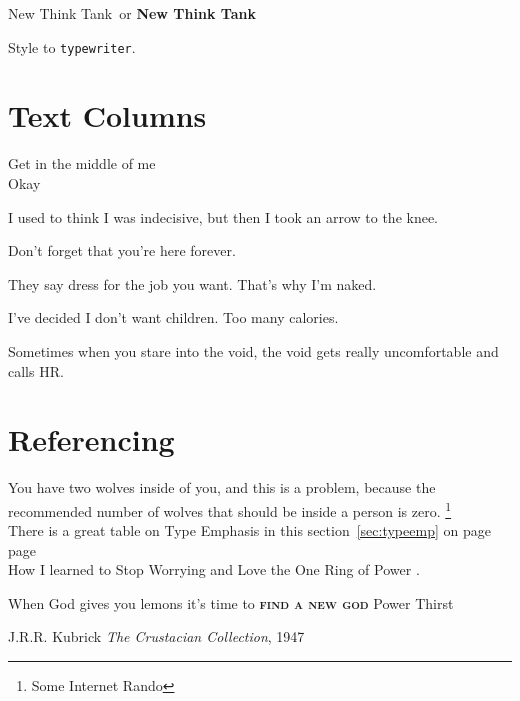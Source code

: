 \documentclass[a4paper,12pt,]{report}
\newcommand{\NTT}{New Think Tank}
\newcommand{\NTTB}{\textbf{New Think Tank}}
\newcommand{\typew}[1]{\texttt{#1}}
\begin{document}
\NTT\ or \NTTB\

Style to \typew{typewriter}.

\section{Text Columns}
{\centering
Get in the middle of me \\
Okay\\[10pt]
}

\quad\parbox{4cm}{I used to think I was indecisive, but then I took an arrow to the knee.}
\quad\parbox{2cm}{Don't forget that you're here for\-ev\-er.}
\quad\parbox{2cm}{\raggedright They say dress for the job you want.  That's why I'm naked.}
\quad\parbox{2cm}{\raggedleft I've decided I don't want children. Too many calories.}

\begin{minipage}{5cm}
Sometimes when you stare into the void, the void gets really uncomfortable and calls HR.
\end{minipage}

\section{Referencing}
You have two wolves inside of you, and this is a problem, because the recommended number of wolves that should be inside a person is zero.
\footnote[2]{Some Internet Rando} \\[5pt]

There is a great table on Type Emphasis in this section~\ref{sec:typeemp} on page~\pageref{sec:typeemp}\\[2pt]

page~\pageref{fig:fuzzyduck}\\[2pt]

How I learned to Stop Worrying and Love the One Ring of Power \cite{ABCLOTR}.

When God gives you lemons it's time to \textsc{\textbf{find a new god}}
{Power Thirst} \\[2pt]

\blindtext

\clearpage
{}
\printindex

\begin{thebibliography}{books}
 J.R.R. Kubrick \emph{The Crustacian Collection}, 1947
\end{thebibliography}
\end{document}
